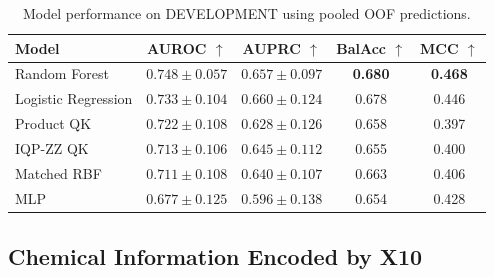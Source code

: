 \documentclass[conference]{IEEEtran}
\newif\ifdraftmode
\newcommand{\draftnote}[1]{%
  \ifdraftmode
    \par\noindent
    \colorbox{yellow!30}{\parbox{\dimexpr\columnwidth-2\fboxsep}{%
      \small\sffamily\textcolor{black!70}{#1}}}%
    \par\smallskip
  \fi
}
\newcommand{\dnote}[1]{%
  \ifdraftmode{\sffamily\small\textcolor{red!70!black}{[#1]}}\fi}
\begin{document}
\draftnote{%
\textbf{Include:}\\
\textbullet\ X10 PCA projection (color by toxicity label; optionally by
   partition).  PCA is an exploratory projection — do \emph{not} claim it
   shows class separation.\\
\textbullet\ LR, RF, RBF-SVC results: AUROC, AUPRC, BalAcc, MCC.}

\begin{table}[htbp]
\caption{Model performance on DEVELOPMENT using pooled OOF predictions.
\dnote{PRELIMINARY --- confirm all values.}}
\label{tab:model_performance}
\centering
\scriptsize
\begin{tabular}{@{}lcccc@{}}
\toprule
\textbf{Model} &
\textbf{AUROC $\uparrow$} &
\textbf{AUPRC $\uparrow$} &
\textbf{BalAcc $\uparrow$} &
\textbf{MCC $\uparrow$} \\
\midrule
Random Forest       & $\mathbf{0.748 \pm 0.057}$ & $0.657 \pm 0.097$ & \textbf{0.680} & \textbf{0.468} \\
Logistic Regression & $0.733 \pm 0.104$ & $\mathbf{0.660 \pm 0.124}$ & 0.678 & 0.446 \\
Product QK          & $0.722 \pm 0.108$ & $0.628 \pm 0.126$ & 0.658 & 0.397 \\
IQP-ZZ QK           & $0.713 \pm 0.106$ & $0.645 \pm 0.112$ & 0.655 & 0.400 \\
Matched RBF         & $0.711 \pm 0.108$ & $0.640 \pm 0.107$ & 0.663 & 0.406 \\
MLP                 & $0.677 \pm 0.125$ & $0.596 \pm 0.138$ & 0.654 & 0.428 \\
\bottomrule
\end{tabular}
\end{table}

\subsection{Chemical Information Encoded by X10}
\label{sec:results-ablation}

\draftnote{%
\textbf{Include:}\\
\textbullet\ Targeted-ablation $\Delta$-AUROC with CIs
   (mark as \textcolor{red}{PRELIMINARY}).\\
\textbullet\ Model-dependent contribution of \texttt{n\_OP}.\\
\textbullet\ Partial complementarity of MolLogP and LiPHEX.\\
\textbullet\ Paired $\Delta$-AUROC with confidence intervals.\\
\textbf{Do not:} make causal claims.}
\end{document}
